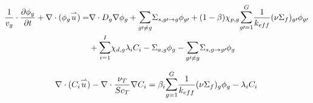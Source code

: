 \documentclass[review]{elsarticle}
\begin{document}
\begin{equation}
\label{eq:mgd}
\begin{split}
\frac{1}{v_{g}} \cdot \frac{\partial \phi_{g}}{\partial t} + \nabla \cdot
    (\phi_{g} \overset{\rightharpoonup}u) = & \nabla \cdot D_{g} \nabla \phi_{g}
    + \mathlarger{\sum}_{g \prime \not= g} \Sigma_{s,g \prime \rightarrow g}
    \phi_{g \prime} + (1-\beta)\chi_{p,g}
    \mathlarger{\sum}_{g \prime = 1}^{G}\frac{1}{k_{eff}}
    (\nu \Sigma_{f})_{g \prime}\phi_{g\prime}\\ &+ 
    \mathlarger{\sum}_{i = 1}^{I}\chi_{d,g}\lambda_{i}C_{i} 
     - \Sigma_{a,g}\phi_{g} - \mathlarger{\sum}_{g \prime \not= g} 
    \Sigma_{s,g \rightarrow g \prime} \phi_{g} 
\end{split}
\end{equation}

\begin{equation}
\label{eq:mgd_dnp}
\nabla \cdot (C_{i} \overset{\rightharpoonup}u) - 
    \nabla \cdot \frac{\nu_{T}}{Sc_{T}}\nabla C_{i}
    = \beta_{i} \mathlarger{\sum}_{g = 1}^{G} \frac{1}{k_{eff}} 
    (\nu \Sigma_{f})_{g} \phi_{g} - \lambda_{i} C_{i}
\end{equation}
\end{document}
